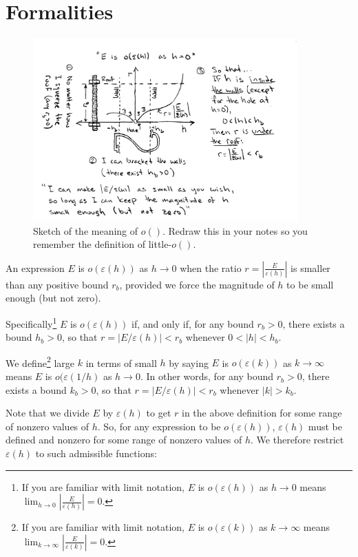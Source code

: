 \section{Formalities}
\begin{figure}
\begin{center}
\includegraphics[width=4in]{graphics/littleo.png}
\end{center}
\caption[$o()$ sketch.]{Sketch of the meaning of $o()$.  Redraw this in your notes so you remember the definition of little-$o()$.}
\label{fig:littleo}
\end{figure}

An expression $E$ is  $o(\varepsilon(h))$ as $h \rightarrow 0$ when the ratio $r = \left| \frac{E}{\varepsilon(h)} \right|$ is smaller than any positive bound $r_b$, provided we force the magnitude of $h$ to be small enough (but not zero). 

Specifically\footnote{If you are familiar with limit notation, $E$ is  $o(\varepsilon(h))$ as $h \rightarrow 0$ means $\lim_{h\rightarrow 0} \left|\frac{E}{\varepsilon(h)}\right| = 0$.} $E$ is  $o(\varepsilon(h))$ if, and only if, for any bound $r_b>0$, there exists a bound $h_b>0$, so that $r=|E/\varepsilon(h)|<r_b$ whenever $0 < |h| < h_b$.

We define\footnote{If you are familiar with limit notation, $E$ is  $o(\varepsilon(k))$ as $k \rightarrow \infty$ means $\lim_{k\rightarrow \infty} \left|\frac{E}{\varepsilon(k)}\right| = 0$.} large $k$ in terms of small $h$ by saying $E$ is $o(\varepsilon(k))$ as $k \rightarrow \infty$ means $E$ is $o(\varepsilon(1/h)$ as $h \rightarrow 0$.  In other words, for any bound $r_b>0$, there exists a bound $k_b>0$, so that $r=|E/\varepsilon(h)|<r_b$ whenever $|k|>k_b$.
 
Note that we divide $E$ by $\varepsilon(h)$ to get $r$  in the above definition for some range of nonzero values of $h$. So, for any expression to be $o(\varepsilon(h))$,  $\varepsilon(h)$  must be defined and nonzero for some range of nonzero values of $h$.  We therefore restrict $\varepsilon(h)$ to such admissible functions:   

